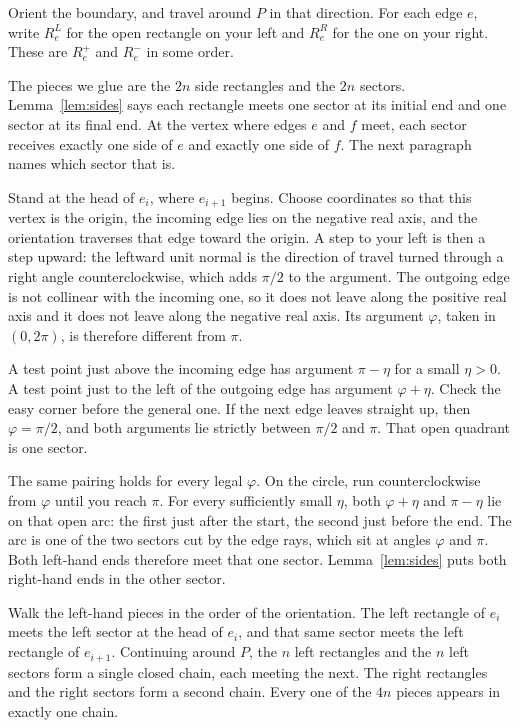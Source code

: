 Orient the boundary, and travel around $P$ in that direction. For each edge $e$, write $R_e^L$ for the open rectangle on your left and $R_e^R$ for the one on your right. These are $R_e^+$ and $R_e^-$ in some order.

The pieces we glue are the $2n$ side rectangles and the $2n$ sectors. Lemma~\ref{lem:sides} says each rectangle meets one sector at its initial end and one sector at its final end. At the vertex where edges $e$ and $f$ meet, each sector receives exactly one side of $e$ and exactly one side of $f$. The next paragraph names which sector that is.

Stand at the head of $e_i$, where $e_{i+1}$ begins. Choose coordinates so that this vertex is the origin, the incoming edge lies on the negative real axis, and the orientation traverses that edge toward the origin. A step to your left is then a step upward: the leftward unit normal is the direction of travel turned through a right angle counterclockwise, which adds $\pi/2$ to the argument. The outgoing edge is not collinear with the incoming one, so it does not leave along the positive real axis and it does not leave along the negative real axis. Its argument $\varphi$, taken in $(0,2\pi)$, is therefore different from $\pi$.

A test point just above the incoming edge has argument $\pi-\eta$ for a small $\eta>0$. A test point just to the left of the outgoing edge has argument $\varphi+\eta$. Check the easy corner before the general one. If the next edge leaves straight up, then $\varphi=\pi/2$, and both arguments lie strictly between $\pi/2$ and $\pi$. That open quadrant is one sector.

The same pairing holds for every legal $\varphi$. On the circle, run counterclockwise from $\varphi$ until you reach $\pi$. For every sufficiently small $\eta$, both $\varphi+\eta$ and $\pi-\eta$ lie on that open arc: the first just after the start, the second just before the end. The arc is one of the two sectors cut by the edge rays, which sit at angles $\varphi$ and $\pi$. Both left-hand ends therefore meet that one sector. Lemma~\ref{lem:sides} puts both right-hand ends in the other sector.

Walk the left-hand pieces in the order of the orientation. The left rectangle of $e_i$ meets the left sector at the head of $e_i$, and that same sector meets the left rectangle of $e_{i+1}$. Continuing around $P$, the $n$ left rectangles and the $n$ left sectors form a single closed chain, each meeting the next. The right rectangles and the right sectors form a second chain. Every one of the $4n$ pieces appears in exactly one chain.

